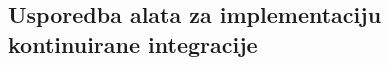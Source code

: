 \documentclass[times, utf8, diplomski, numeric]{fer}
\begin{document}
\begin{appendices}
\chapter{Usporedba alata za implementaciju kontinuirane integracije} \label{UsporedbaCIAlata_DodatakC}

\end{appendices}
\end{document}
